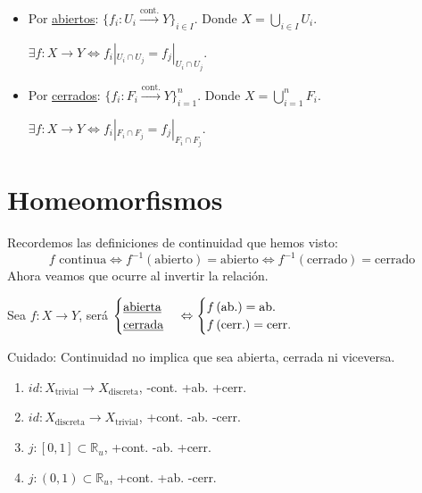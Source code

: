 \begin{defi}
\begin{itemize}
    \item Por \underline{abiertos}: $\{f_i: U_i \xrightarrow{\text{cont.}} Y\}_{i \in I}$. Donde $X = \bigcup_{i \in I} U_i$. 

    $\exists f: X \rightarrow Y \Leftrightarrow f_i|_{U_i \cap U_j} = f_j|_{U_i \cap U_j}$.

    \item Por \underline{cerrados}: $\{f_i: F_i \xrightarrow{\text{cont.}} Y\}_{i = 1}^n$. Donde $X = \bigcup_{i = 1}^n F_i$. 

    $\exists f: X \rightarrow Y \Leftrightarrow f_i|_{F_i \cap F_j} = f_j|_{F_i \cap F_j}$.
\end{itemize} 
\end{defi}

\section{Homeomorfismos}%
\label{sec:homeomorfismos}
Recordemos las definiciones de continuidad que hemos visto:
\[
f \text{ continua} \Leftrightarrow f^{-1}\left( \text{abierto} \right) = \text{abierto} \Leftrightarrow f^{-1}\left( \text{cerrado} \right) = \text{cerrado} 
\]
Ahora veamos que ocurre al invertir la relación.
\begin{defi}
Sea $f: X \rightarrow Y$, será $\begin{cases}
    \text{\underline{abierta}} \\
    \text{\underline{cerrada}} 
\end{cases} \Leftrightarrow \begin{cases}
    f\left( \text{ab.} \right) = \text{ab.}\\
    f\left( \text{cerr.} \right) = \text{cerr.} 
\end{cases} $    
\end{defi}

\begin{obs}
Cuidado: Continuidad no implica que sea abierta, cerrada ni viceversa.
\end{obs}

\begin{ej}
\begin{enumerate}
    \item $id: X_{\text{trivial}} \rightarrow X_{\text{discreta}}$, -cont. +ab. +cerr.
    \item $id: X_{\text{discreta}} \rightarrow X_{\text{trivial}}$, +cont. -ab. -cerr.
    \item $j: \left[ 0, 1 \right] \subset \mathbb{R}_{u}$, +cont. -ab. +cerr.
    \item $j: \left( 0, 1 \right) \subset \mathbb{R}_u$, +cont. +ab. -cerr.
\end{enumerate}
\end{ej}

